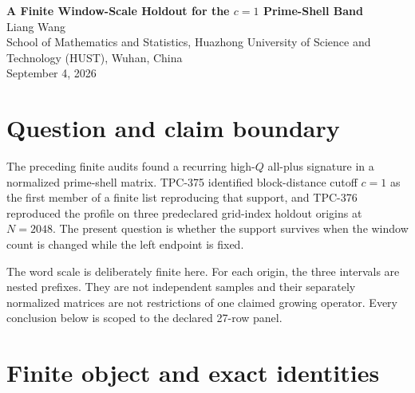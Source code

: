\documentclass[10pt]{article}
\begin{document}
\small

\begin{center}
{\Large\bf A Finite Window-Scale Holdout for the $c=1$ Prime-Shell Band}\\[5pt]
Liang Wang\\
School of Mathematics and Statistics, Huazhong University of Science and
Technology (HUST), Wuhan, China\\
September 4, 2026
\end{center}

\begin{abstract}
TPC-376 moved the first finite bandwidth cutoff matching a high-$Q$ failure
support to a response-blind grid-index holdout at count $2048$. This paper
tests the next scale question without changing that origin family or its
normalization. We freeze the nested counts $N=1024,1536,2048$, three
origins, and $Q=512,2048,8192$ before reading any response, giving 27
rows. The $c=1$ spectral failure profile is $(0,3,3)$ at every count:
18 of 27 rows fail the spectral cap and no row fails the Schur cap. The
selected full-mode band Rayleigh retention ranges from
$0.93760019185559207$ to $0.98047323365759775$. This is a finite
nested-prefix scale audit. It does not establish a growing operator bound,
origin or window uniformity, source-uniform arithmetic $L^2$, a power
saving, or a twin-prime theorem.
\end{abstract}

\section{Question and claim boundary}

The preceding finite audits found a recurring high-$Q$ all-plus signature in
a normalized prime-shell matrix. TPC-375 identified block-distance cutoff
$c=1$ as the first member of a finite list reproducing that support, and
TPC-376 reproduced the profile on three predeclared grid-index holdout
origins at $N=2048$. The present question is whether the support survives
when the window count is changed while the left endpoint is fixed.

The word scale is deliberately finite here. For each origin, the three
intervals are nested prefixes. They are not independent samples and their
separately normalized matrices are not restrictions of one claimed growing
operator. Every conclusion below is scoped to the declared 27-row panel.

\section{Finite object and exact identities}
\end{document}
